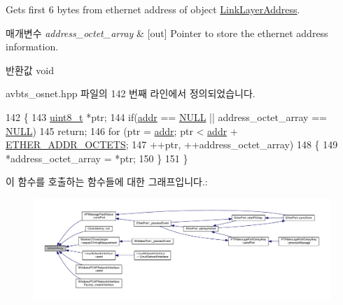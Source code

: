 Gets first 6 bytes from ethernet address of object \hyperlink{class_link_layer_address}{Link\+Layer\+Address}. 


\begin{DoxyParams}{매개변수}
{\em address\+\_\+octet\+\_\+array} & \mbox{[}out\mbox{]} Pointer to store the ethernet address information. \\
\hline
\end{DoxyParams}
\begin{DoxyReturn}{반환값}
void 
\end{DoxyReturn}


avbts\+\_\+osnet.\+hpp 파일의 142 번째 라인에서 정의되었습니다.


\begin{DoxyCode}
142                                                      \{
143         \hyperlink{stdint_8h_aba7bc1797add20fe3efdf37ced1182c5}{uint8\_t} *ptr;
144         \textcolor{keywordflow}{if}(\hyperlink{class_link_layer_address_ab8af51bba340e97aebc45b9c943fb17c}{addr} == \hyperlink{openavb__types__base__pub_8h_a070d2ce7b6bb7e5c05602aa8c308d0c4}{NULL} || address\_octet\_array == \hyperlink{openavb__types__base__pub_8h_a070d2ce7b6bb7e5c05602aa8c308d0c4}{NULL})
145             \textcolor{keywordflow}{return};
146         \textcolor{keywordflow}{for} (ptr = \hyperlink{class_link_layer_address_ab8af51bba340e97aebc45b9c943fb17c}{addr}; ptr < \hyperlink{class_link_layer_address_ab8af51bba340e97aebc45b9c943fb17c}{addr} + \hyperlink{ptptypes_8hpp_ab81d402a4929723091a6731508845125}{ETHER\_ADDR\_OCTETS};
147              ++ptr, ++address\_octet\_array)
148         \{
149             *address\_octet\_array = *ptr;
150         \}
151     \}
\end{DoxyCode}


이 함수를 호출하는 함수들에 대한 그래프입니다.\+:
\nopagebreak
\begin{figure}[H]
\begin{center}
\leavevmode
\includegraphics[width=350pt]{class_link_layer_address_a1e2896b540d2ea6182d351332737db91_icgraph}
\end{center}
\end{figure}




